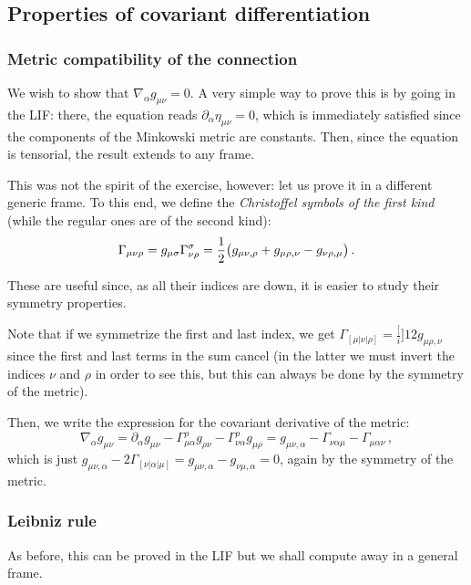 \documentclass[main.tex]{subfiles}
\begin{document}
\subsection{Properties of covariant differentiation}

\subsubsection{Metric compatibility of the connection}

We wish to show that \(\nabla_{\alpha } g_{\mu \nu } = 0\).
A very simple way to prove this is by going in the LIF: there, the equation reads \(\partial_{\alpha }\eta_{\mu \nu } = 0\), which is immediately satisfied since the components of the Minkowski metric are constants.
Then, since the equation is tensorial, the result extends to any frame.

This was not the spirit of the exercise, however: let us prove it in a different generic frame.
To this end, we define the \emph{Christoffel symbols of the first kind} (while the regular ones are of the second kind): 
%
\begin{equation}
  \Gamma_{\mu \nu \rho } = g_{\mu \sigma }\Gamma^{\sigma }_{\nu \rho } = \frac{1}{2} \qty(g_{\mu \nu, \rho } + g_{\mu \rho , \nu } - g_{\nu \rho, \mu })
\,.
\end{equation}

These are useful since, as all their indices are down, it is easier to study their symmetry properties.

Note that if we symmetrize the first and last index, we get \(\Gamma_{[\mu | \nu | \rho]} = \frac[i]{1}{2} g_{\mu \rho, \nu }\) since the first and last terms in the sum cancel (in the latter we must invert the indices \(\nu \) and \(\rho \) in order to see this, but this can always be done by the symmetry of the metric).

Then, we write the expression for the covariant derivative of the metric: 
%
\begin{equation}
  \nabla_{\alpha }g_{\mu \nu }= \partial_\alpha g_{\mu \nu }
  - \Gamma^{\rho }_{\mu \alpha }g_{\rho \nu } 
  - \Gamma^{\rho }_{\nu \alpha  }g_{\mu \rho  } 
  = g_{\mu \nu , \alpha } 
  - \Gamma_{\nu \alpha \mu }
  - \Gamma_{\mu \alpha \nu }
\,,
\end{equation}
%
which is just \(g_{\mu \nu , \alpha } - 2 \Gamma_{[\nu | \alpha | \mu ]} = g_{\mu \nu , \alpha } - g_{\nu \mu , \alpha } = 0\), again by the symmetry of the metric.

\subsubsection{Leibniz rule}

As before, this can be proved in the LIF but we shall compute away in a general frame.
\end{document}
